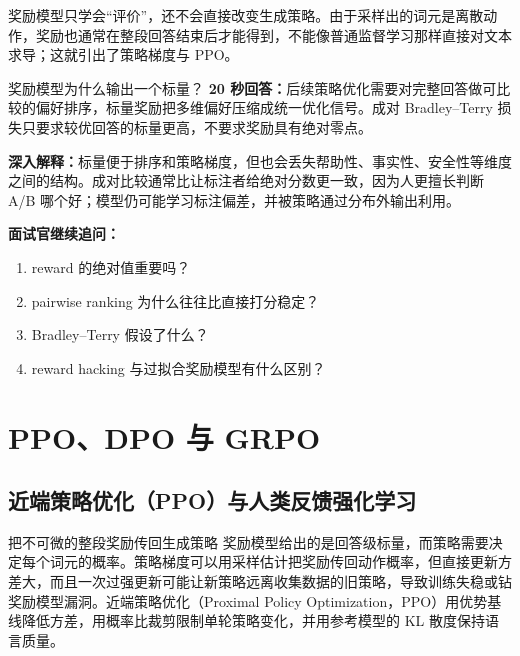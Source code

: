 奖励模型只学会“评价”，还不会直接改变生成策略。由于采样出的词元是离散动作，奖励也通常在整段回答结束后才能得到，不能像普通监督学习那样直接对文本求导；这就引出了策略梯度与 PPO。

\begin{interviewbox}{奖励模型为什么输出一个标量？}
\textbf{20 秒回答：}后续策略优化需要对完整回答做可比较的偏好排序，标量奖励把多维偏好压缩成统一优化信号。成对 Bradley--Terry 损失只要求较优回答的标量更高，不要求奖励具有绝对零点。

\textbf{深入解释：}标量便于排序和策略梯度，但也会丢失帮助性、事实性、安全性等维度之间的结构。成对比较通常比让标注者给绝对分数更一致，因为人更擅长判断 A/B 哪个好；模型仍可能学习标注偏差，并被策略通过分布外输出利用。

\textbf{面试官继续追问：}
\begin{enumerate}
  \item reward 的绝对值重要吗？
  \item pairwise ranking 为什么往往比直接打分稳定？
  \item Bradley--Terry 假设了什么？
  \item reward hacking 与过拟合奖励模型有什么区别？
\end{enumerate}
\end{interviewbox}

\chapter{PPO、DPO 与 GRPO}

\figPpoGrpo

\section{近端策略优化（PPO）与人类反馈强化学习}
\label{sec:ppo}

\begin{motivationbox}{把不可微的整段奖励传回生成策略}
奖励模型给出的是回答级标量，而策略需要决定每个词元的概率。策略梯度可以用采样估计把奖励传回动作概率，但直接更新方差大，而且一次过强更新可能让新策略远离收集数据的旧策略，导致训练失稳或钻奖励模型漏洞。近端策略优化（Proximal Policy Optimization，PPO）用优势基线降低方差，用概率比裁剪限制单轮策略变化，并用参考模型的 KL 散度保持语言质量。
\end{motivationbox}

